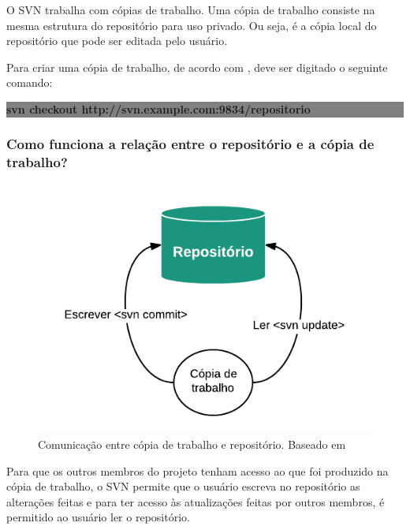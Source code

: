 O SVN trabalha com cópias de trabalho. Uma cópia de trabalho consiste na mesma estrutura do repositório para uso privado. Ou seja, é a cópia local do repositório que pode ser editada pelo usuário.

Para criar uma cópia de trabalho, de acordo com , deve ser digitado o seguinte comando: 


\begin{centering}
\colorbox{Gray}{
\begin{minipage}{320px}
  \textbf{svn checkout http://svn.example.com:9834/repositorio}
\end{minipage}
}

\end{centering}

\subsubsection{Como funciona a relação entre o repositório e a cópia de trabalho?}

\begin{figure}[!htb]
\centering
\includegraphics[scale=1]{figuras/repositorio_copia.png}
\caption{Comunicação entre cópia de trabalho e repositório. Baseado em \cite{svn-book}}
\end{figure}


Para que os outros membros do projeto tenham acesso ao que foi produzido na cópia de trabalho, o SVN permite que o usuário escreva no repositório as alterações feitas
e para ter acesso às atualizações feitas por outros membros, é permitido ao usuário ler o repositório. \cite{svn-book}

